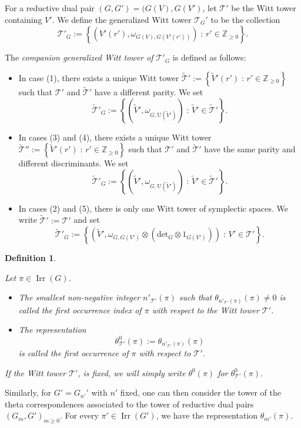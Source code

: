 \documentclass[12pt]{amsart}
\numberwithin{equation}{subsection}
\newtheorem{defn}[equation]{Definition}
\newcommand{\ZZ}{\mathbb{Z}}
\newcommand{\cT}{\mathcal{T}}
\newcommand{\rU}{\mathrm{U}}
\newcommand{\Irr}{\operatorname{Irr}}
\def\cT{{\mathcal{T}}}
\def\deter{{\mathrm{det}}}
\begin{document}
For a reductive dual pair $(G,G')=(G(V),G(V')$, let $\cT'$ be the Witt tower containing $V'$. We define the generalized Witt tower $\cT_G'$ to be the collection
\begin{equation}
\cT'_G:=\left\{(V'(r'),\omega_{G(V),G(V'(r'))})\;:\,r'\in \ZZ_{\ge 0}\right\}.
\end{equation}

The \textit{companion generalized Witt tower of  $\cT'_G$} is defined as follows:
\begin{itemize}
\item[$\bullet$]
In case (1), there exists a unique Witt tower 
$\widetilde\cT':=\left\{\widetilde V'(r')\;:\,r'\in \ZZ_{\ge 0}\right\}$ such that  $\cT'$ and $\widetilde\cT'$ have a different parity. We set
\[\widetilde\cT'_G:=\left\{(\widetilde V',\omega_{G,\rU(\widetilde V')})\;:\,\widetilde V'\in\widetilde\cT'\right\}.\]
\item[$\bullet$]
In cases (3) and (4), there exists a unique Witt tower $\widetilde\cT'':=\left\{\widetilde V'(r')\;:\,r'\in \ZZ_{\ge 0}\right\}$ such that $\cT'$ and $\widetilde\cT'$ have the same parity and different discriminants. We set
\[\widetilde\cT'_G:=\left\{(\widetilde V',\omega_{G,\rU(\widetilde V')})\;:\,\widetilde V'\in\widetilde\cT'\right\}.\]
\item[$\bullet$]
In cases (2) and (5), there is only one Witt tower of symplectic spaces.  We write $\widetilde\cT':=\cT'$ and set
\[\widetilde\cT'_G:=\left\{(\widetilde V',\omega_{G,G(V')}\otimes (\deter_{G}\otimes 1_{G(V')}))\;:\, V'\in\cT'\right\}.\]
\end{itemize}

\begin{defn} \label{defn:first-occurr} {\rm 
Let $\pi\in\Irr(G)$.
\begin{itemize}
\item 
The smallest non-negative integer $n'_{\cT'}(\pi)$ such that $\theta_{n'_{\cT'}(\pi)}(\pi)\ne 0$ is called the \textit{first occurrence index of $\pi$ with respect to the Witt tower $\cT'$}.
\item The representation 
\[\theta^0_{\cT'}(\pi):=\theta_{n'_{\cT'}(\pi)}(\pi)\] is called the \textit{first occurrence of $\pi$ with respect to  $\cT'$}.
\end{itemize} 
If the Witt tower $\cT'$, is fixed, we will  simply write $\theta^0(\pi)$ for $\theta^0_{\cT'}(\pi)$.}
\end{defn}

Similarly, for $G'=G_{n'}'$ with $n'$ fixed, one can then consider the tower of the theta correspondences associated to the tower of reductive dual pairs $(G_{m}, G')_{m\ge 0}$. 
For every $\pi'\in\Irr(G')$, we have the representation $\theta_{m'}(\pi)$. 
\end{document}
